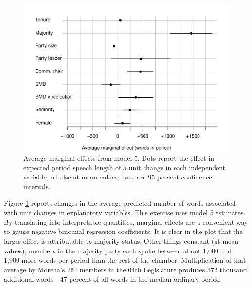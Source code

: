 \documentclass[letter,12pt]{article}
\begin{document}
\begin{figure}
  \centering
    \includegraphics[width=.67\columnwidth]{../plots/avgMgEffects.pdf}
    \caption{Average marginal effects from model 5. Dots report the effect in expected period speech length of a unit change in each independent variable, all else at mean values; bars are 95-percent confidence intervals.}\label{F:avgmgeff}
\end{figure}


Figure \ref{F:avgmgeff} reports changes in the average predicted number of words associated with unit changes in explanatory variables. This exercise uses model 5 estimates. By translating into interpretable quantities, marginal effects are a convenient way to gauge negative binomial regression coefficients. It is clear in the plot that the larges effect is attributable to majority status. Other things constant (at mean values), members in the majority party each spoke between about 1,000 and 1,900 more words per period than the rest of the chamber. Multiplication of that average by Morena's 254 members in the 64th Legislature produces 372 thousand additional words---47 percent of all words in the median ordinary period.
\end{document}
